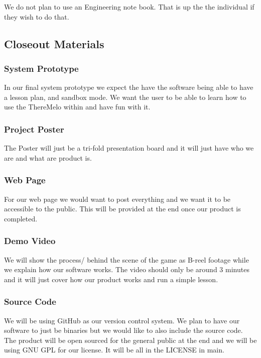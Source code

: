 We do not plan to use an Engineering note book. That is up the the individual if they wish to do that.

\subsection{Closeout Materials}

\subsubsection{System Prototype}

In our final system prototype we expect the have the software being able to have a lesson plan, and sandbox mode. We want the user to be able to learn how to use the ThereMelo within and have fun with it. 


\subsubsection{Project Poster}

The Poster will just be a tri-fold presentation board and it will just have who we are and what are product is. 

\subsubsection{Web Page}

For our web page we would want to post everything and we want it to be accessible to the public. This will be provided at the end once our product is completed. 

\subsubsection{Demo Video}

We will show the process/ behind the scene of the game as B-reel footage while we explain how our software works. The video should only be around 3 minutes and it will just cover how our product works and run a simple lesson. 

\subsubsection{Source Code}

We will be using GitHub as our version control system. We plan to have our software to just be binaries but we would like to also include the source code. The product will be open sourced for the general public at the end and we will be using GNU GPL for our license. It will be all in the LICENSE in main. 


